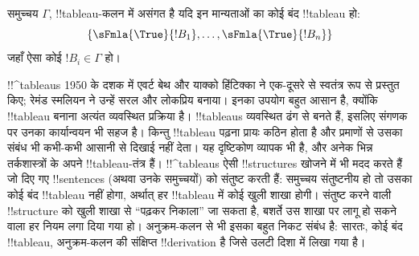 \documentclass[../../../include/open-logic-section]{subfiles}
\begin{document}
समुच्चय $\Gamma$, !!{tableau}-कलन में असंगत है यदि इन मान्यताओं का कोई बंद
!!{tableau} हो:
\[
\{\sFmla{\True}{!B_1}, \dots, \sFmla{\True}{!B_n}\} 
\]
जहाँ ऐसा कोई $!B_i \in \Gamma$ हो।

!!^{tableau}s 1950 के दशक में एवर्ट बेथ और याक्को हिंटिक्का ने एक-दूसरे से
स्वतंत्र रूप से प्रस्तुत किए; रेमंड स्मलियन ने उन्हें सरल और लोकप्रिय
बनाया। इनका उपयोग बहुत आसान है, क्योंकि !!{tableau} बनाना अत्यंत व्यवस्थित
प्रक्रिया है। !!{tableau}s व्यवस्थित ढंग से बनते हैं, इसलिए संगणक पर उनका
कार्यान्वयन भी सहज है। किन्तु !!{tableau} पढ़ना प्रायः कठिन होता है और प्रमाणों
से उसका संबंध भी कभी-कभी आसानी से दिखाई नहीं देता। यह दृष्टिकोण व्यापक भी है,
और अनेक भिन्न तर्कशास्त्रों के अपने !!{tableau}-तंत्र हैं। !!^{tableau}s ऐसी
!!{structure}s खोजने में भी मदद करते हैं जो दिए गए !!{sentence}s (अथवा उनके
समुच्चयों) को संतुष्ट करती हैं: समुच्चय संतुष्टनीय हो तो उसका कोई बंद
!!{tableau} नहीं होगा, अर्थात् हर !!{tableau} में कोई खुली शाखा होगी। संतुष्ट
करने वाली !!{structure} को खुली शाखा से ``पढ़कर निकाला'' जा सकता है, बशर्ते
उस शाखा पर लागू हो सकने वाला हर नियम लगा दिया गया हो। अनुक्रम-कलन से भी इसका
बहुत निकट संबंध है: सारतः, कोई बंद !!{tableau}, अनुक्रम-कलन की संक्षिप्त
!!{derivation} है जिसे उलटी दिशा में लिखा गया है।
\end{document}

